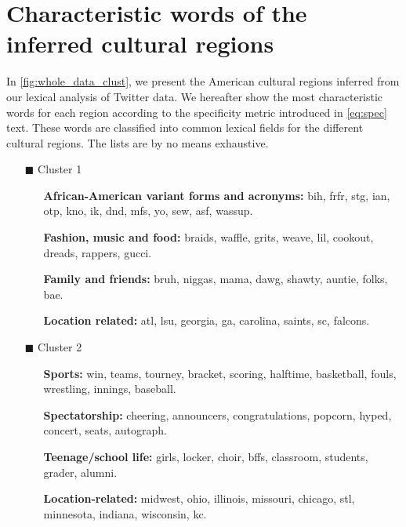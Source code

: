 \documentclass[../thesis.tex]{subfiles}
\begin{document}
\chapter{Characteristic words of the inferred cultural regions}
\label{ch:appendix_acr_words}

In \cref{fig:whole_data_clust}, we present the American cultural regions inferred from
our lexical analysis of Twitter data. We hereafter show the most characteristic words
for each region according to the specificity metric introduced in \cref{eq:spec} text.
These words are classified into common lexical fields for the different cultural
regions. The lists are by no means exhaustive.

\begin{itemize}
  \item[\color{tol1}$\blacksquare$] Cluster 1
  \begin{itemize}
    \item[] \textbf{African-American variant forms and acronyms:} bih, frfr, stg, ian, otp, kno, ik, dnd, mfs, yo, sew, asf, wassup.
    \item[] \textbf{Fashion, music and food:} braids, waffle, grits, weave, lil, cookout, dreads, rappers, gucci.
    \item[] \textbf{Family and friends:} bruh, niggas, mama, dawg, shawty, auntie, folks, bae.
    \item[] \textbf{Location related:} atl, lsu, georgia, ga, carolina, saints, sc, falcons.
  \end{itemize}

  \item[\color{tol4}$\blacksquare$] Cluster 2
  \begin{itemize}
    \item[] \textbf{Sports:} win, teams, tourney, bracket, scoring, halftime, basketball, fouls, wrestling, innings, baseball.
    \item[] \textbf{Spectatorship:} cheering, announcers, congratulations, popcorn, hyped, concert, seats, autograph.
    \item[] \textbf{Teenage/school life:} girls, locker, choir, bffs, classroom, students, grader, alumni.
    \item[] \textbf{Location-related:} midwest, ohio, illinois, missouri, chicago, stl, minnesota, indiana, wisconsin, kc.
  \end{itemize}
  

\end{itemize}
\end{document}
